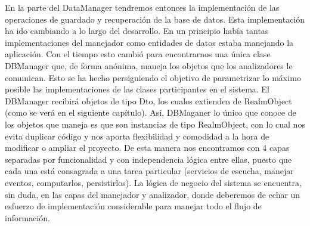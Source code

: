 \documentclass[12pt,a4paper,oneside]{book} %
\begin{document}
\newline 
\newline 
En la parte del DataManager tendremos entonces la implementación de las operaciones de guardado y recuperación de la base de datos. Esta implementación ha ido cambiando a lo largo del desarrollo. En un principio había tantas implementaciones del manejador como entidades de datos estaba manejando la aplicación. Con el tiempo esto cambió para encontrarnos una única clase DBManager que, de forma anónima, maneja los objetos que los analizadores le comunican. 
\newline \newline 
Esto se ha hecho persiguiendo el objetivo de parametrizar lo máximo posible las implementaciones de las clases participantes en el sistema. El DBManager recibirá objetos de tipo Dto, los cuales extienden de RealmObject (como se verá en el siguiente capítulo). Así, DBMaganer lo único que conoce de los objetos que maneja es que son instancias de tipo RealmObject, con lo cual nos evita duplicar código y nos aporta flexibilidad y comodidad a la hora de modificar o ampliar el proyecto. 
\newline \newline
De esta manera nos encontramos con 4 capas separadas por funcionalidad y con independencia lógica entre ellas, puesto que cada una está consagrada a una tarea particular (servicios de escucha, manejar eventos, computarlos, persistirlos). 
\newline \newline
La lógica de negocio del sistema se encuentra, sin duda, en las capas del manejador y analizador, donde deberemos de echar un esfuerzo de implementación considerable para manejar todo el flujo de información. 
\newline \newline 
\end{document}
